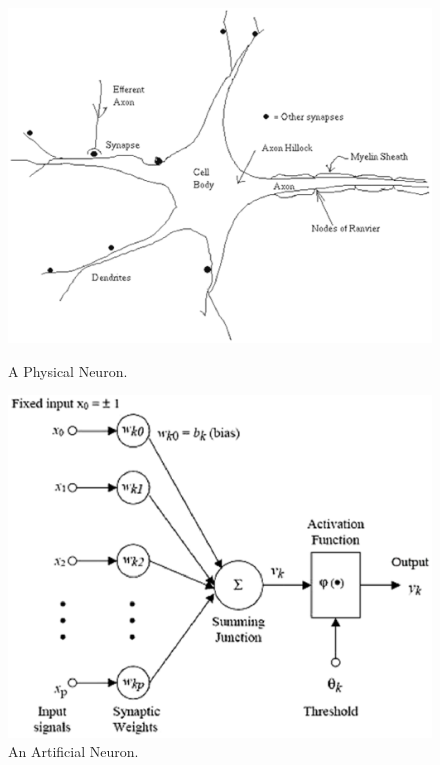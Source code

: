 \begin{figure}[ht]
\begin{minipage}[b]{0.5\linewidth}
\centering
\includegraphics[scale=0.40]{figures/ann/physical_neuron.eps}
\caption{A Physical Neuron.}
\label{figure_physical_neuron}
\end{minipage}
\hspace{0.5cm}
\begin{minipage}[b]{0.5\linewidth}
\centering
\includegraphics[scale=0.40]{figures/ann/artificial_neuron.eps}
\caption{An Artificial Neuron.}
\label{figure_artificial_neuron}
\end{minipage}
\end{figure}

